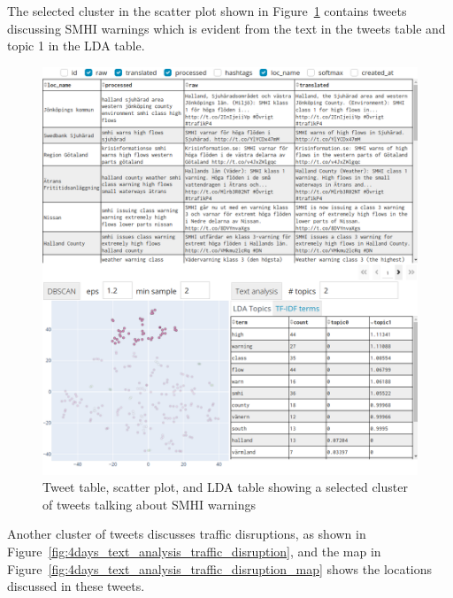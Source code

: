 The selected cluster in the scatter plot shown in Figure~\ref{fig:4days_text_analysis} contains tweets discussing \ac{SMHI}
warnings which is evident from the text in the tweets table and topic 1 in the \ac{LDA} table. 

\begin{figure}[H]
  \begin{center}
    \includegraphics[width=\columnwidth]{./images/4days_text_analysis.png}
  \end{center}
  \caption{Tweet table, scatter plot, and \ac{LDA} table showing a selected cluster of tweets
  talking about \ac{SMHI} warnings}
  \label{fig:4days_text_analysis}
\end{figure}

Another cluster of tweets discusses traffic disruptions, as shown in Figure~\ref{fig:4days_text_analysis_traffic_disruption}, and the map in
Figure~\ref{fig:4days_text_analysis_traffic_disruption_map} shows the locations discussed in these tweets.

